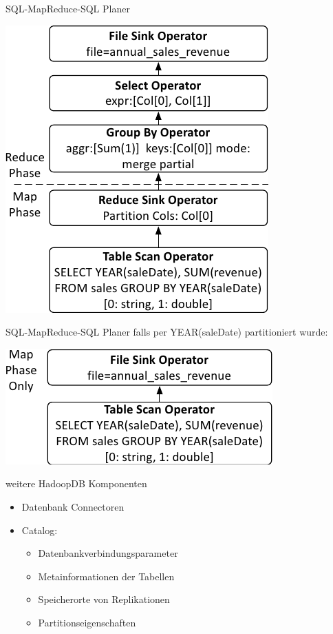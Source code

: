 \documentclass{beamer}
\begin{document}
\begin{frame}{SQL-MapReduce-SQL Planer}
  \begin{center}
    \includegraphics[height=0.8\textheight]{../ausarbeitung/images/hadoopdb-reduce-map-phase_c.png}    
  \end{center}
\end{frame}
\begin{frame}{SQL-MapReduce-SQL Planer}
falls per YEAR(saleDate) partitioniert wurde:
  \begin{center}
    \includegraphics[height=0.3\textheight]{../ausarbeitung/images/hadoopdb-reduce-map-phase_b.png}    
  \end{center}
\end{frame}

\begin{frame}{weitere HadoopDB Komponenten}
  \begin{itemize}
  \item Datenbank Connectoren
  \item Catalog:
    \begin{itemize}
    \item Datenbankverbindungsparameter
    \item Metainformationen der Tabellen
    \item Speicherorte von Replikationen
    \item Partitionseigenschaften
    \end{itemize}
  \end{itemize}
\end{frame}
\end{document}
